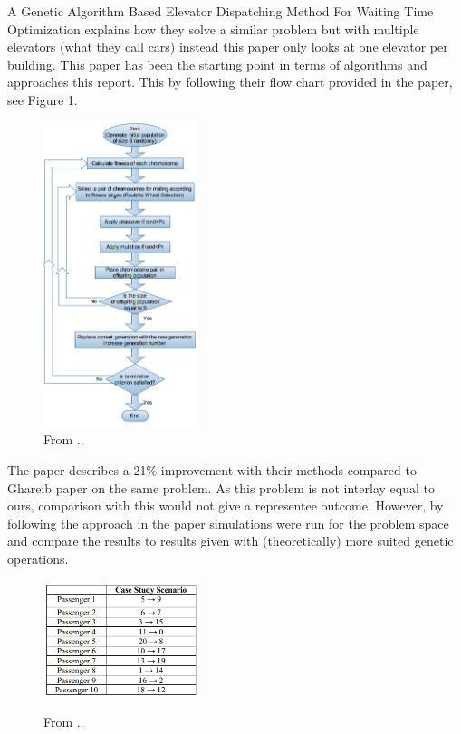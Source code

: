 
A Genetic Algorithm Based Elevator Dispatching Method For Waiting Time Optimization \cite{tartan2016genetic} explains how they solve a similar problem but with multiple elevators (what they call cars) instead this paper only looks at one elevator per building. This paper has been the starting point in terms of algorithms and approaches this report. This by following their flow chart provided in the paper, see Figure 1. 

\begin{figure}[h!]
\centering
\includegraphics[width=0.4\textwidth]{diagram_1.png}
\caption{From ..}
	\label{fig:Flow_1}
\end{figure}
The paper describes a 21\% improvement with their methods compared to Ghareib paper \cite{gharieb2005optimal} on the same problem. As this problem is not interlay equal to ours, comparison with this would not give a representee outcome. However, by following the approach in the paper simulations were run for the problem space and compare the results to results given with (theoretically) more suited genetic operations.
\newpage

\begin{figure}[h!]
\centering
\includegraphics[width=0.4\textwidth]{tabel_1.png}
	\label{fig:Tabel_1}
\caption{From ..}
\end{figure}

